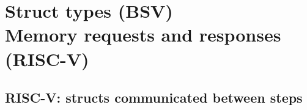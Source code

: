 

\chapter{Struct types {\large (BSV)}\\
Memory requests and responses {\large (RISC-V)}}


\setcounter{page}{1}
\renewcommand{\thepage}{\arabic{chapter}-\arabic{page}}

\label{ch_Structs_Mem_Reqs_Rsps}


\section{RISC-V: structs communicated between steps}



